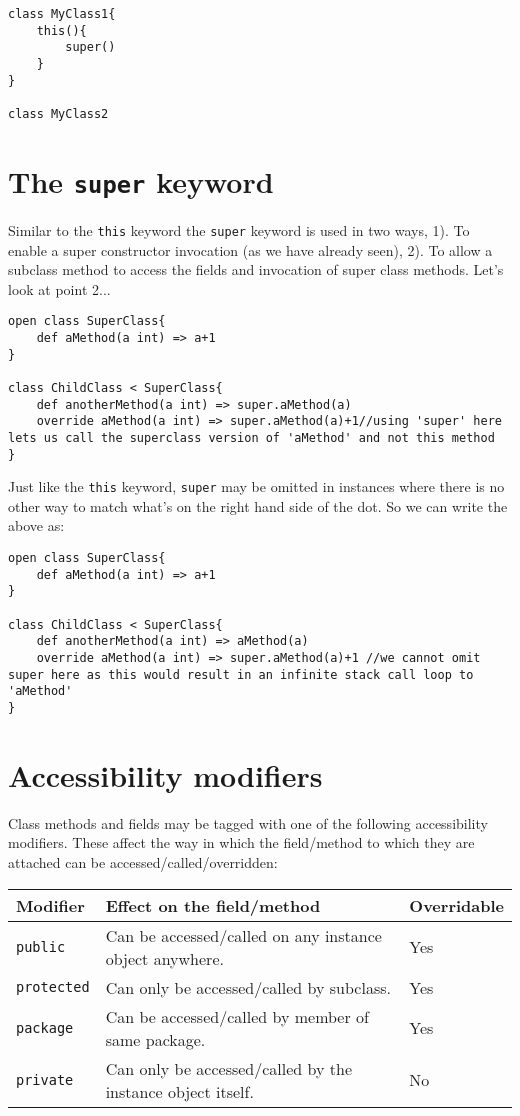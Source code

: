 \documentclass[conc-doc]{subfiles}
\begin{document}
\begin{lstlisting}
class MyClass1{
	this(){
		super()
	}
}

class MyClass2
\end{lstlisting}

\section{The \lstinline{super} keyword}
Similar to the \lstinline{this} keyword the \lstinline{super} keyword is used in two ways, 1). To enable a super constructor invocation (as we have already seen), 2). To allow a subclass method to access the fields and invocation of super class methods. Let's look at point 2...

\begin{lstlisting}
open class SuperClass{
	def aMethod(a int) => a+1
}

class ChildClass < SuperClass{
	def anotherMethod(a int) => super.aMethod(a)
	override aMethod(a int) => super.aMethod(a)+1//using 'super' here lets us call the superclass version of 'aMethod' and not this method
}
\end{lstlisting}

Just like the \lstinline{this} keyword, \lstinline{super} may be omitted in instances where there is no other way to match what's on the right hand side of the dot. So we can write the above as:

\begin{lstlisting}
open class SuperClass{
	def aMethod(a int) => a+1
}

class ChildClass < SuperClass{
	def anotherMethod(a int) => aMethod(a)
	override aMethod(a int) => super.aMethod(a)+1 //we cannot omit super here as this would result in an infinite stack call loop to 'aMethod'
}
\end{lstlisting}

\section{Accessibility modifiers}
Class methods and fields may be tagged with one of the following accessibility modifiers. These affect the way in which the field/method to which they are attached can be accessed/called/overridden:


\begin{table}[H]
	\centering
	\begin{tabular}{lll}
		\hline
		Modifier&Effect on the field/method&Overridable\\
		\hline
		\lstinline!public!&Can be accessed/called on any instance object anywhere.&Yes\\
		\lstinline!protected!&Can only be accessed/called by subclass.&Yes\\
		\lstinline!package!&Can be accessed/called by member of same package.&Yes\\
		\lstinline!private!&Can only be accessed/called by the instance object itself.&No\\
		\hline
	\end{tabular}%
\end{table}
\end{document}
